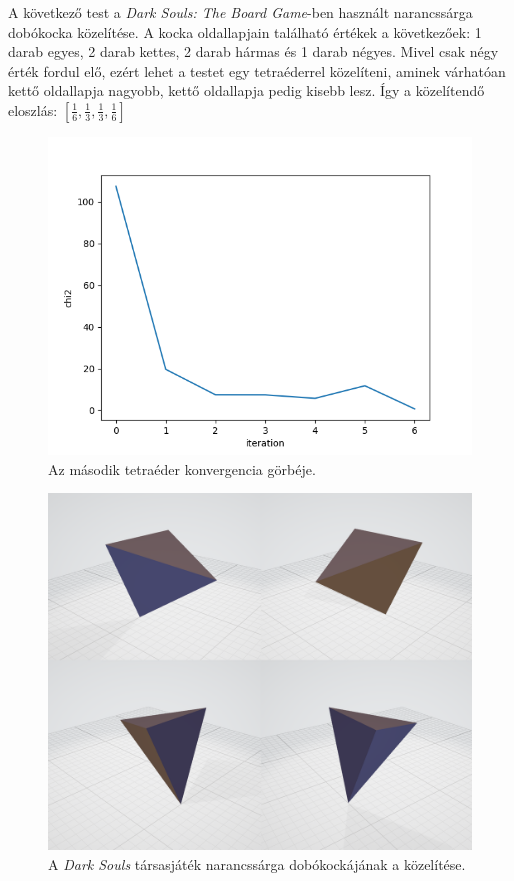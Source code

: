 A következő test a \textit{Dark Souls: The Board Game}-ben \cite{darksouls} használt narancssárga dobókocka közelítése.
A kocka oldallapjain található értékek a következőek: 1 darab egyes, 2 darab kettes, 2 darab hármas és 1 darab négyes.
Mivel csak négy érték fordul elő, ezért lehet a testet egy tetraéderrel közelíteni, aminek várhatóan kettő oldallapja nagyobb, kettő oldallapja pedig kisebb lesz.
Így a közelítendő eloszlás: $[\frac{1}{6}, \frac{1}{3}, \frac{1}{3}, \frac{1}{6}]$

\begin{figure}[h!]
	\centering
	\includegraphics[scale=0.7]{images/tetrahedron_02.png}
	\caption{Az második tetraéder konvergencia görbéje.}
	\label{fig:tetra02}
\end{figure}

\begin{figure}[h!]
	\centering
	\includegraphics[width=\textwidth]{images/tetra02obj.png}
	\caption{A \textit{Dark Souls} társasjáték narancssárga dobókockájának a közelítése.}
	\label{fig:tetra02obj}
\end{figure}

